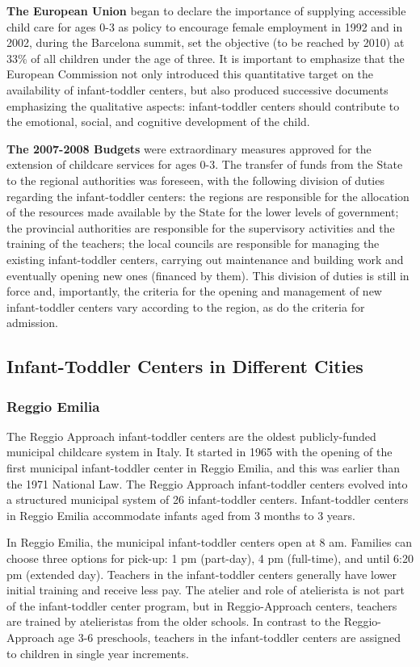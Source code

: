 \textbf{The European Union} began to declare the importance of supplying accessible child care for ages 0-3 as policy to encourage female employment in 1992 and in 2002, during the Barcelona summit, set the objective (to be reached by 2010) at 33\% of all children under the age of three. It is important to emphasize that the European Commission not only introduced this quantitative target on the availability of infant-toddler centers, but also produced successive documents emphasizing the qualitative aspects: infant-toddler centers should contribute to the emotional, social, and cognitive development of the child. 

\textbf{The 2007-2008 Budgets} were extraordinary measures approved for the extension of childcare services for ages 0-3. The transfer of funds from the State to the regional authorities was foreseen, with the following division of duties regarding the infant-toddler centers: the regions are responsible for the allocation of the resources made available by the State for the lower levels of government; the provincial authorities are responsible for the supervisory activities and the training of the teachers; the local councils are responsible for managing the existing infant-toddler centers, carrying out maintenance and building work and eventually opening new ones (financed by them). This division of duties is still in force and, importantly, the criteria for the opening and management of new infant-toddler centers vary according to the region, as do the criteria for admission. 


\subsection{Infant-Toddler Centers in Different Cities}
\subsubsection{Reggio Emilia}
The Reggio Approach infant-toddler centers are the oldest publicly-funded municipal childcare system in Italy. It started in 1965 with the opening of the first municipal infant-toddler center in Reggio Emilia, and this was earlier than the 1971 National Law. The Reggio Approach infant-toddler centers evolved into a structured municipal system of 26 infant-toddler centers. Infant-toddler centers in Reggio Emilia accommodate infants aged from 3 months to 3 years. 

In Reggio Emilia, the municipal infant-toddler centers open at 8 am. Families can choose three options for pick-up: 1 pm (part-day), 4 pm (full-time), and until 6:20 pm (extended day). Teachers in the infant-toddler centers generally have lower initial training and receive less pay. The atelier and role of atelierista is not part of the infant-toddler center program, but in Reggio-Approach centers, teachers are trained by atelieristas from the older schools. In contrast to the Reggio-Approach age 3-6 preschools, teachers in the infant-toddler centers are assigned to children in single year increments.  


